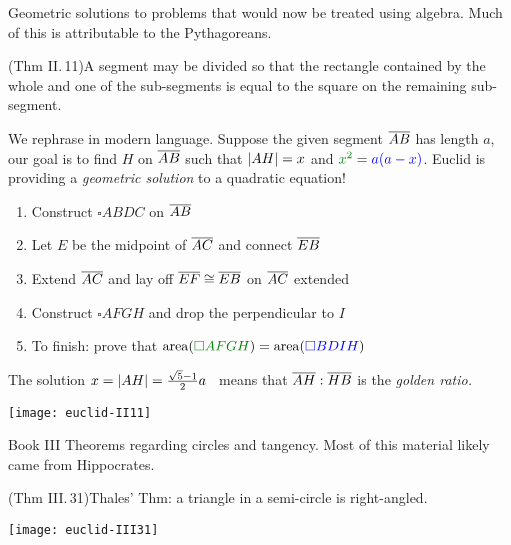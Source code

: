 \begin{description}\item[Book II]\lstsp
	Geometric solutions to problems that would now be treated using algebra. Much of this is attributable to the Pythagoreans.\par
	(Thm II.\,11)\lstsp A segment may be divided so that the rectangle contained by the whole and one of the sub-segments is equal to the square on the remaining sub-segment.\par
	We rephrase in modern language. Suppose the given segment $\overline{AB}$ has length $a$, our goal is to find $H$ on $\overline{AB}$ such that $\left| AH\right|=x$ and $\textcolor{Green}{x^2}=\textcolor{blue}{a(a-x)}$. Euclid is providing a \emph{geometric solution} to a quadratic equation!\par
\begin{minipage}[t]{0.69\linewidth}\vspace{-8pt}
\begin{enumerate}\itemsep2pt
  \item Construct $\square ABDC$ on $\overline{AB}$
	\item Let $E$ be the midpoint of $\overline{AC}$ and connect $\overline{EB}$
	\item Extend $\overline{AC}$ and lay off $\overline{EF}\cong\overline{EB}$ on $\overline{AC}$ extended
	\item Construct $\square AFGH$ and drop the perpendicular to $I$
	\item To finish: prove that $\operatorname{area}(\textcolor{Green}{\square AFGH}) =\operatorname{area}(\textcolor{blue}{\square BDIH})$
\end{enumerate}
The solution $x=\left| AH\right|=\frac{\sqrt 5-1}2a$ \, means that $\overline{AH}:\overline{HB}$ is the \emph{golden ratio.}
\end{minipage}\hfill\begin{minipage}[t]{0.3\linewidth}\vspace{-10pt}
\flushright\texttt{[image: euclid-II11]}
\end{minipage}\medbreak



\begin{minipage}[t]{0.74\linewidth}\vspace{0pt}
\item[Book III]\lstsp Theorems regarding circles and tangency. Most of this material likely came from Hippocrates.\label{pg:thalesthm}\par
  (Thm III.\,31)\lstsp Thales' Thm: a triangle in a semi-circle is right-angled.  
\end{minipage}\hfill\begin{minipage}[t]{0.25\linewidth}\vspace{0pt}
\flushright\texttt{[image: euclid-III31]}
\end{minipage}



\end{description}
